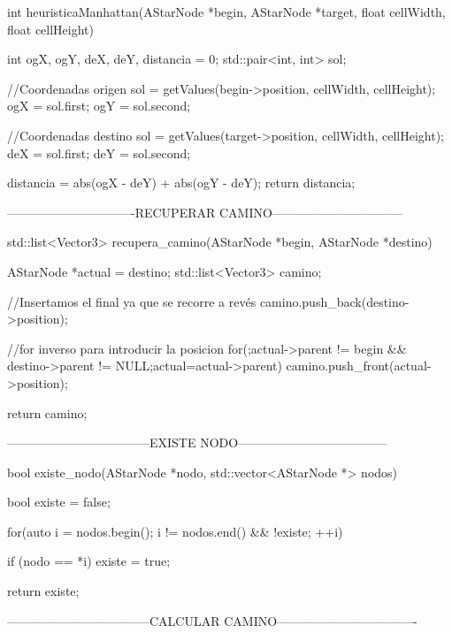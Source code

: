 int heuristicaManhattan(AStarNode *begin, AStarNode *target, float cellWidth, float cellHeight)
{
    int ogX, ogY, deX, deY, distancia = 0;
    std::pair<int, int> sol;
    
    //Coordenadas origen
    sol = getValues(begin->position, cellWidth, cellHeight);
    ogX = sol.first; ogY = sol.second;

    //Coordenadas destino
    sol = getValues(target->position, cellWidth, cellHeight);
    deX = sol.first; deY = sol.second;

    distancia = abs(ogX - deY) + abs(ogY - deY);
    return distancia;
}

-------------------------------RECUPERAR CAMINO--------------------------------

std::list<Vector3> recupera_camino(AStarNode *begin, AStarNode *destino)
{
    AStarNode *actual = destino;
    std::list<Vector3> camino;

    //Insertamos el final ya que se recorre a revés
    camino.push_back(destino->position);

    //for inverso para introducir la posicion
    for(;actual->parent != begin && destino->parent != NULL;actual=actual->parent)
        camino.push_front(actual->position);

    return camino;
}

-----------------------------------EXISTE NODO------------------------------------

bool existe_nodo(AStarNode *nodo, std::vector<AStarNode *> nodos)
{
    bool existe = false;
    
    for(auto i = nodos.begin(); i != nodos.end() && !existe; ++i){
        
        if (nodo == *i)
            existe = true;
        
    }
    
    return existe;
}

-----------------------------------CALCULAR CAMINO----------------------------------

